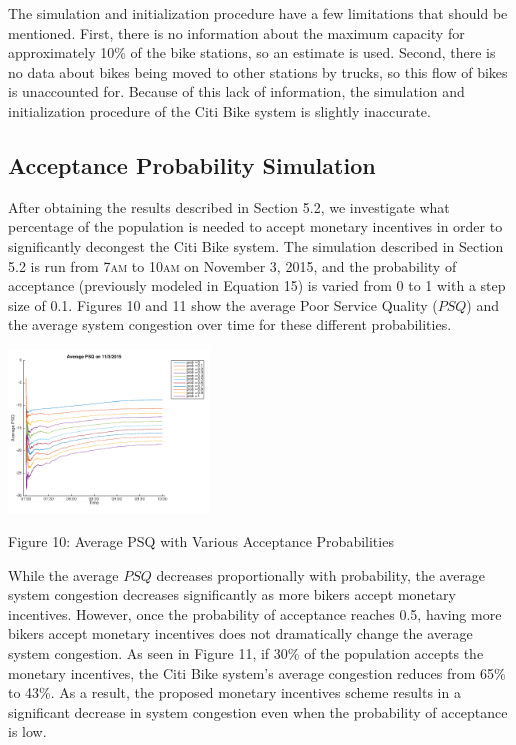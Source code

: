 \documentclass[times, 10pt,twocolumn]{article}
\begin{document}
The simulation and initialization procedure have a few limitations that should be mentioned. First, there is no information about the maximum capacity for approximately 10\% of the bike stations, so an estimate is used. Second, there is no data about bikes being moved to other stations by trucks, so this flow of bikes is unaccounted for. Because of this lack of information, the simulation and initialization procedure of the Citi Bike system is slightly inaccurate.

\subsection{Acceptance Probability Simulation}

After obtaining the results described in Section 5.2, we investigate what percentage of the population is needed to accept monetary incentives in order to significantly decongest the Citi Bike system. The simulation described in Section 5.2 is run from 7\textsc{am} to 10\textsc{am} on November 3, 2015, and the probability of acceptance (previously modeled in Equation 15) is varied from 0 to 1 with a step size of 0.1. Figures 10 and 11 show the average Poor Service Quality ($PSQ$) and the average system congestion over time for these different probabilities.

\hfill \break
\centerline{\includegraphics[width=0.4\textwidth]{m4/Average_PSQ_Nov3_Prob.png}}
\centerline{Figure 10: Average PSQ with Various Acceptance Probabilities}
\hfill \break

While the average $PSQ$ decreases proportionally with probability, the average system congestion decreases significantly as more bikers accept monetary incentives. However, once the probability of acceptance reaches 0.5, having more bikers accept monetary incentives does not dramatically change the average system congestion. As seen in Figure 11, if 30\% of the population accepts the monetary incentives, the Citi Bike system's average congestion reduces from 65\% to 43\%. As a result, the proposed monetary incentives scheme results in a significant decrease in system congestion even when the probability of acceptance is low.
\end{document}
